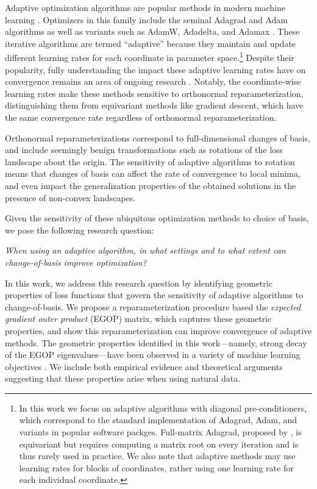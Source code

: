 \documentclass{article}
\begin{document}
Adaptive optimization algorithms are popular methods in modern machine learning \cite{Crew_2020}. Optimizers in this family include the seminal Adagrad and Adam algorithms as well as variants such as AdamW, Adadelta, and Adamax \cite{kingma2017adammethodstochasticoptimization, loshchilov2019decoupledweightdecayregularization,reddi2019convergenceadam, zeiler2012adadeltaadaptivelearningrate}. These iterative algorithms are termed ``adaptive'' because they maintain and update different learning rates for each coordinate in parameter space.\footnote{In this work we focus on adaptive algorithms with diagonal pre-conditioners, which correspond to the standard implementation of Adagrad, Adam, and variants in popular software packges. Full-matrix Adagrad, proposed by \citet{duchi2011adaptive}, is equivariant but requires computing a matrix root on every iteration and is thus rarely used in practice. We also note that adaptive methods may use learning rates for blocks of coordinates, rather using one learning rate for each individual coordinate.} Despite their popularity, fully understanding the impact these adaptive learning rates have on convergence remains an area of ongoing research \cite{jiang2024convergence, liu2024adagrad, maes2024understanding}. Notably, the coordinate-wise learning rates make these methods sensitive to orthonormal reparameterization, distinguishing them from equivariant methods like gradient descent, which have the same convergence rate regardless of orthonormal reparameterization.

Orthonormal reparameterizations correspond to full-dimensional changes of basis, and include seemingly benign transformations such as rotations of the loss landscape about the origin. The sensitivity of adaptive algorithms to rotation means that changes of basis can affect the rate of convergence to local minima, and even impact the generalization properties of the obtained solutions in the presence of non-convex landscapes.

Given the sensitivity of these ubiquitous optimization methods to choice of basis, we pose the following research question:
\begin{myquote}
    \noindent\it{When using an adaptive algorithm, in what settings and to what extent can change-of-basis improve optimization?}
\end{myquote}
In this work, we address this research question by identifying geometric properties of loss functions that govern the sensitivity of adaptive algorithms to change-of-basis. We propose a reparameterization procedure based the \emph{expected gradient outer product} (EGOP) matrix, which captures these geometric properties, and show this reparameterization can improve convergence of adaptive methods. The geometric properties identified in this work---namely, strong decay of the EGOP eigenvalues---have been observed in a variety of machine learning objectives \cite{ papyan2018full,sagun2017empirical, zhang2024transformers}. We include both empirical evidence and theoretical arguments suggesting that these properties arise when using natural data.
\end{document}
